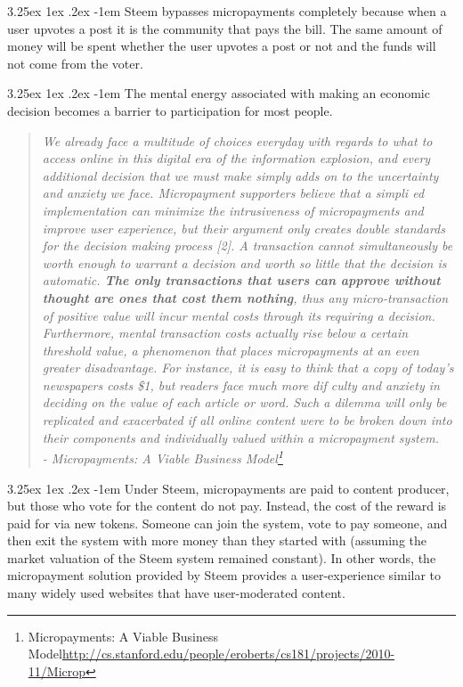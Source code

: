 \documentclass{article}
\makeatletter
\renewcommand\paragraph{\@startsection{paragraph}{5}{\z@}%
  {3.25ex \@plus1ex \@minus.2ex}%
  {-1em}%
  {\normalfont\normalsize\bfseries}}
\makeatother
\begin{document}
			\paragraph{}
				Steem bypasses micropayments completely because when a user upvotes a post it is the community that pays the bill. The same amount of money will be spent whether the user upvotes a post or not and the funds will not come from the voter.

			\paragraph{}
				The mental energy associated with making an economic decision becomes a barrier to participation for most people.

			\begin{quote}
					\textit{We already face a multitude of choices everyday with regards to what to access online in this digital era of the information explosion, and every additional decision that we must make simply adds on to the uncertainty and anxiety we face. Micropayment supporters believe that a simpli ed implementation can minimize the intrusiveness of micropayments and improve user experience, but their argument only creates double standards for the decision making process [2]. A transaction cannot simultaneously be worth enough to warrant a decision and worth so little that the decision is automatic. \textbf{The only transactions that users can approve without thought are ones that cost them nothing}, thus any micro-transaction of positive value will incur mental costs through its requiring a decision. Furthermore, mental transaction costs actually rise below a certain threshold value, a phenomenon that places micropayments at an even greater disadvantage. For instance, it is easy to think that a copy of today's newspapers costs \$1, but readers face much more dif culty and anxiety in deciding on the value of each article or word. Such a dilemma will only be replicated and exacerbated if all online content were to be broken down into their components and individually valued within a micropayment system.}\\

					\textit{- Micropayments: A Viable Business Model\footnote{Micropayments: A Viable Business Model\newline\url{http://cs.stanford.edu/people/eroberts/cs181/projects/2010-11/Microp}}}
			\end{quote}

			\paragraph{}
				Under Steem, micropayments are paid to content producer, but those who vote for the content do not pay. Instead, the cost of the reward is paid for via new tokens. Someone can join the system, vote to pay someone, and then exit the system with more money than they started with (assuming the market valuation of the Steem system remained constant). In other words, the micropayment solution provided by Steem provides a user-experience similar to many widely used websites that have user-moderated content.
\end{document}

